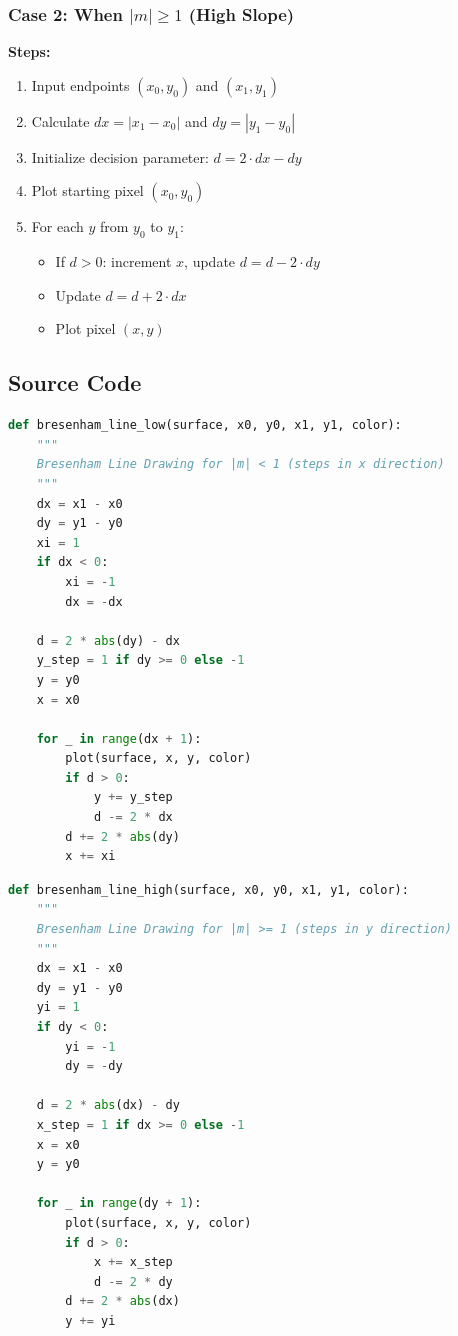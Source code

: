 \documentclass[12pt,a4paper]{article}
\begin{document}
\subsubsection{Case 2: When $|m| \geq 1$ (High Slope)}
\textbf{Steps:}
\begin{enumerate}
    \item Input endpoints $(x_0, y_0)$ and $(x_1, y_1)$
    \item Calculate $dx = |x_1 - x_0|$ and $dy = |y_1 - y_0|$
    \item Initialize decision parameter: $d = 2 \cdot dx - dy$
    \item Plot starting pixel $(x_0, y_0)$
    \item For each $y$ from $y_0$ to $y_1$:
    \begin{itemize}
        \item If $d > 0$: increment $x$, update $d = d - 2 \cdot dy$
        \item Update $d = d + 2 \cdot dx$
        \item Plot pixel $(x, y)$
    \end{itemize}
\end{enumerate}

\subsection{Source Code}
\begin{lstlisting}[language=Python, caption=Bresenham Line Drawing for $|m| < 1$]
def bresenham_line_low(surface, x0, y0, x1, y1, color):
    """
    Bresenham Line Drawing for |m| < 1 (steps in x direction)
    """
    dx = x1 - x0
    dy = y1 - y0
    xi = 1
    if dx < 0:
        xi = -1
        dx = -dx
    
    d = 2 * abs(dy) - dx
    y_step = 1 if dy >= 0 else -1
    y = y0
    x = x0
    
    for _ in range(dx + 1):
        plot(surface, x, y, color)
        if d > 0:
            y += y_step
            d -= 2 * dx
        d += 2 * abs(dy)
        x += xi
\end{lstlisting}

\begin{lstlisting}[language=Python, caption=Bresenham Line Drawing for $|m| \geq 1$]
def bresenham_line_high(surface, x0, y0, x1, y1, color):
    """
    Bresenham Line Drawing for |m| >= 1 (steps in y direction)
    """
    dx = x1 - x0
    dy = y1 - y0
    yi = 1
    if dy < 0:
        yi = -1
        dy = -dy
    
    d = 2 * abs(dx) - dy
    x_step = 1 if dx >= 0 else -1
    x = x0
    y = y0
    
    for _ in range(dy + 1):
        plot(surface, x, y, color)
        if d > 0:
            x += x_step
            d -= 2 * dy
        d += 2 * abs(dx)
        y += yi
\end{lstlisting}
\end{document}
